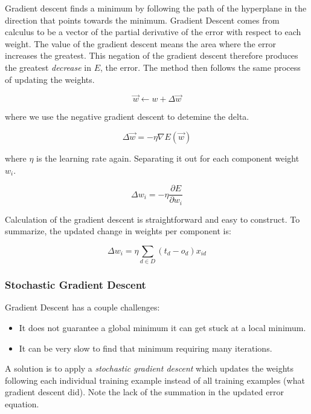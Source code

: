 \documentclass[11pt]{article}
\begin{document}
Gradient descent finds a minimum by following the path of the hyperplane in the direction that points towards the minimum. Gradient Descent comes from calculus to be a vector of the partial derivative of the error with respect to each weight. The value of the gradient descent means the area where the error increases the greatest. This negation of the gradient descent therefore produces the greatest \textit{decrease} in $E$, the error. The method then follows the same process of updating the weights.

\begin{equation}
\vec{w} \leftarrow w + \Delta \vec{w}
\end{equation}

where we use the negative gradient descent to detemine the delta.

\begin{equation}
\Delta\vec{w} = -\eta \nabla E(\vec{w})
\end{equation}

where $\eta$ is the learning rate again. Separating it out for each component weight $w_i$.

\begin{equation}
\Delta w_i = -\eta \frac{\partial E}{\partial w_i}
\end{equation}

Calculation of the gradient descent is straightforward and easy to construct. To summarize, the updated change in weights per component  is:

\begin{equation}
\Delta w_i = \eta \sum_{d\in D} (t_d - o_d) x_{id}
\end{equation}

\subsubsection*{Stochastic Gradient Descent}

Gradient Descent has a couple challenges:

\begin{itemize}
\item It does not guarantee a global minimum it can get stuck at a local minimum.
\item It can be very slow to find that minimum requiring many iterations.
\end{itemize}

A solution is to apply a \textit{stochastic gradient descent} which updates the weights following each individual training example instead of all training examples (what gradient descent did). Note the lack of the summation in the updated error equation.
\end{document}

